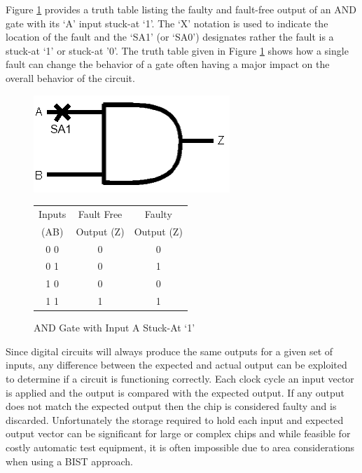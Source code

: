 \documentclass[12pt]{report}
\begin{document}
Figure \ref{fig:andtruth} provides a truth table listing the faulty and fault-free output of an AND gate with its `A' input stuck-at `1'.  The `X' notation is used to indicate the location of the fault and the `SA1' (or `SA0') designates rather the fault is a stuck-at `1' or stuck-at '0'\cite{stroud}.  The truth table given in Figure \ref{fig:andtruth} shows how a single fault can change the behavior of a gate often having a major impact on the overall behavior of the circuit.
\begin{figure}[b!]
	\begin{center}
	\begin{minipage}[l]{.45\textwidth}
		\includegraphics[scale=.7]{images/and-gate}
	\end{minipage}
	\begin{minipage}[r]{.45\textwidth}
		\begin{tabular}{|c|c|c|}
			\hline
			Inputs & Fault Free & Faulty \\
			(AB) & Output (Z) & Output (Z) \\ \hline
			0 0 & 0 & 0 \\ \hline
			0 1 & 0 & 1 \\ \hline
			1 0 & 0 & 0 \\ \hline
			1 1 & 1 & 1 \\ \hline
		\end{tabular}
	\end{minipage}
	\end{center}
	\caption{AND Gate with Input A Stuck-At `1'}
	\label{fig:andtruth}
\end{figure}
Since digital circuits will always produce the same outputs for a given set of inputs, any difference between the expected and actual output can be exploited to determine if a circuit is functioning correctly\cite{stroud}.  Each clock cycle an input vector is applied and the output is compared with the expected output.  If any output does not match the expected output then the chip is considered faulty and is discarded.  Unfortunately the storage required to hold each input and expected output vector can be significant for large or complex chips and while feasible for costly automatic test equipment, it is often impossible due to area considerations when using a BIST approach\cite{faultdiagnosis}.
\end{document}
